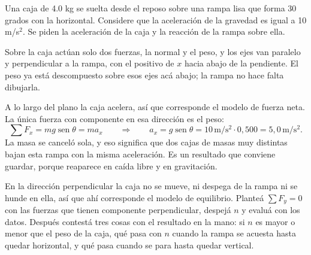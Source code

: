 \documentclass[11pt,openany]{book}
\newcommand{\sen}{\operatorname{sen}}
\begin{document}
\begin{ejemplo}[parcial]
Una caja de 4.0 kg se suelta desde el reposo sobre una rampa lisa que forma 30 grados con la horizontal. Considere que la aceleración de la gravedad es igual a 10 m/s$^2$. Se piden la aceleración de la caja y la reacción de la rampa sobre ella.

Sobre la caja actúan solo dos fuerzas, la normal y el peso, y los ejes van paralelo y perpendicular a la rampa, con el positivo de $x$ hacia abajo de la pendiente. El peso ya está descompuesto sobre esos ejes acá abajo; la rampa no hace falta dibujarla.

\begin{center}
\end{center}

A lo largo del plano la caja acelera, así que corresponde el modelo de fuerza neta. La única fuerza con componente en esa dirección es el peso:
\[
\sum F_x = mg\sen\theta = ma_x
\qquad\Longrightarrow\qquad
a_x = g\sen\theta = 10\,\mathrm{m/s^2}\cdot 0{,}500 = 5{,}0\,\mathrm{m/s^2}.
\]
La masa se canceló sola, y eso significa que dos cajas de masas muy distintas bajan esta rampa con la misma aceleración. Es un resultado que conviene guardar, porque reaparece en caída libre y en gravitación.

En la dirección perpendicular la caja no se mueve, ni despega de la rampa ni se hunde en ella, así que ahí corresponde el modelo de equilibrio. Planteá $\sum F_y = 0$ con las fuerzas que tienen componente perpendicular, despejá $n$ y evaluá con los datos. Después contestá tres cosas con el resultado en la mano: si $n$ es mayor o menor que el peso de la caja, qué pasa con $n$ cuando la rampa se acuesta hasta quedar horizontal, y qué pasa cuando se para hasta quedar vertical.
\end{ejemplo}
\end{document}
